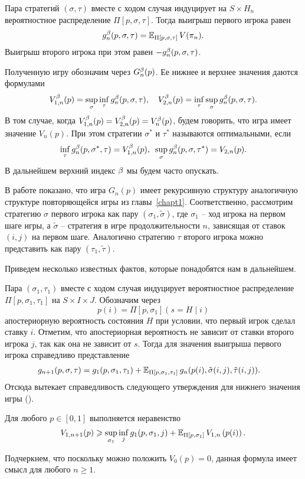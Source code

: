{Пара стратегий $(\sigma, \tau)$ вместе с ходом случая индуцирует на $S \times H_n$ вероятностное распределение $\Pi[p, \sigma, \tau]$.
Тогда выигрыш первого игрока равен
\[
  g^{\beta}_n(p, \sigma, \tau) = \operatorname{\mathbb{E}}_{\Pi[p, \sigma, \tau]} V(\pi_{n}).
\]
Выигрыш второго игрока при этом равен $-g^{\beta}_n(p, \sigma, \tau)$.

Полученную игру обозначим через $G^{\beta}_n(p)$. 
Ее нижнее и верхнее значения даются формулами
\begin{align*}
  V^{\beta}_{1,n}(p) = \sup_\sigma \inf_\tau g^{\beta}_n(p, \sigma, \tau), \quad
  V^{\beta}_{2,n}(p) = \inf_\tau \sup_\sigma g^{\beta}_n(p, \sigma, \tau).
\end{align*}
В том случае, когда $V^{\beta}_{1,n}(p) = V^{\beta}_{2,n}(p) = V^{\beta}_n(p)$, будем говорить, что игра имеет значение $V_n(p)$.
При этом стратегии $\sigma^*$ и $\tau^*$ называются оптимальными, если
\[
  \inf_\tau g^{\beta}_n(p, \sigma^*, \tau) = V^{\beta}_{1,n}(p), \enskip 
  \sup_\sigma g^{\beta}_n(p, \sigma, \tau^*) = V_{2,n}(p).
\]
В дальнейшем верхний индекс $\beta$ мы будем часто опускать.

В работе \cite{demeyer02} показано, что игра $G_n(p)$ имеет рекурсивную структуру аналогичную структуре повторяющейся игры из главы~\ref{chapt1}.
Соответственно, рассмотрим стратегию $\sigma$ первого игрока как пару $(\sigma_1, \tilde{\sigma})$, где $\sigma_1$ -- ход игрока на первом шаге игры, а $\tilde{\sigma}$ -- стратегия в игре продолжительности $n$, зависящая от ставок $(i, j)$ на первом шаге.
Аналогично стратегию $\tau$ второго игрока можно представить как пару $(\tau_1, \tilde{\tau})$.

Приведем несколько известных фактов, которые понадобятся нам в дальнейшем.

Пара $(\sigma_1, \tau_1)$ вместе с ходом случая индуцирует вероятностное распределение $\Pi[p, \sigma_1, \tau_1]$ на $S \times I \times J$.
Обозначим через
\[
  p(i) = \Pi[p, \sigma_1](s = H \; | \; i)
\]
апостериорную вероятность состояния $H$ при условии, что первый игрок сделал ставку $i$.
Отметим, что апостериорная вероятность не зависит от ставки второго игрока $j$, так как она не зависит от $s$.
Тогда для значения выигрыша первого игрока справедливо представление
\begin{align*}
  g_{n+1}(p, \sigma, \tau) 
  &= 
    g_1(p, \sigma_1, \tau_1) +
    \operatorname{\mathbb{E}}_{\Pi[p, \sigma_1, \tau_1]}
    g_n(p(i), \tilde{\sigma}(i, j), \tilde{\tau}(i, j)).
\end{align*}
Отсюда вытекает справедливость следующего утверждения для нижнего значения игры (\seename \cite{demeyer02}).
\begin{lemma}
  \label{ch3:lem:low-bound-primal}
  Для любого $p \in [0, 1]$ выполняется неравенство
  \begin{equation}
    V_{1,n+1}(p) \geqslant \sup_{\sigma_1} \inf_{j} g_1(p, \sigma_1, j)
    + \operatorname{\mathbb{E}}_{\Pi[p, \sigma_1]} V_{1,n}\left( p(i) \right).
  \end{equation}
\end{lemma}
Подчеркнем, что поскольку можно положить $V_0(p) = 0$, данная формула имеет смысл для любого $n \geqslant 1$.

}
